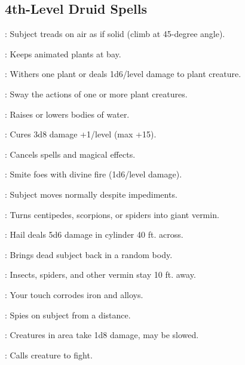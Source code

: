 \begin{multicols}{2}
\subsection{4th-Level Druid Spells}
\begin{description*}
\item[\linkspell{Air Walk}:] Subject treads on air as if solid (climb at 45-degree angle).
\item[\linkspell{Antiplant Shell}:] Keeps animated plants at bay.
\item[\linkspell{Blight}:] Withers one plant or deals 1d6/level damage to plant creature.
\item[\linkspell{Command Plants}:] Sway the actions of one or more plant creatures.
\item[\linkspell{Control Water}:] Raises or lowers bodies of water.
\item[\linkspell{Cure Serious Wounds}:] Cures 3d8 damage +1/level (max +15).
\item[\linkspell{Dispel Magic}:] Cancels spells and magical effects.
\item[\linkspell{Flame Strike}:] Smite foes with divine fire (1d6/level damage).
\item[\linkspell{Freedom of Movement}:] Subject moves normally despite impediments.
\item[\linkspell{Giant Vermin}:] Turns centipedes, scorpions, or spiders into giant vermin.
\item[\linkspell{Ice Storm}:] Hail deals 5d6 damage in cylinder 40 ft. across.
\item[\linkspell{Reincarnate}:] Brings dead subject back in a random body.
\item[\linkspell{Repel Vermin}:] Insects, spiders, and other vermin stay 10 ft. away.
\item[\linkspell{Rusting Grasp}:] Your touch corrodes iron and alloys.
\item[\linkspell{Scrying}:] Spies on subject from a distance.
\item[\linkspell{Spike Stones}:] Creatures in area take 1d8 damage, may be slowed.
\item[\linkspell{Summon Nature’s Ally IV}:] Calls creature to fight.
\end{description*}


\end{multicols}
